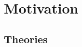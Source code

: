 \chapter{Motivation}
\label{cha:motivation}

\section{Theories}

\begin{note}











\end{note}

